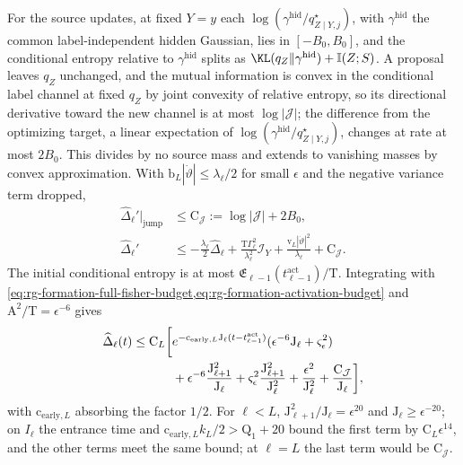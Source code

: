 For the source updates, at fixed \(Y=y\) each
\(\log(\gamma^{\mathrm{hid}}/q^\star_{Z\mid Y,j})\), with \(\gamma^{\mathrm{hid}}\)
the common label-independent hidden Gaussian, lies in \([-B_0,B_0]\), and the
conditional entropy relative to \(\gamma^{\mathrm{hid}}\) splits as
\(\KL(q_Z\Vert\gamma^{\mathrm{hid}})+\mathbb I(Z;S)\). A proposal leaves \(q_Z\)
unchanged, and the mutual information is convex in the conditional label
channel at fixed \(q_Z\) by joint convexity of relative entropy, so its
directional derivative toward the new channel is at most \(\log|\mathcal J|\);
the difference from the optimizing target, a linear expectation of
\(\log(\gamma^{\mathrm{hid}}/q^\star_{Z\mid Y,j})\), changes at rate at most
\(2B_0\). This divides by no source mass and extends to vanishing masses by
convex approximation. With \(\mathrm b_L|\dot\vartheta|\le\lambda_\ell/2\) for
small \(\epsilon\) and the negative variance term dropped,
\begin{align}
 \widehat\Delta_\ell'|_{\mathrm{jump}}&\le
 \mathrm C_{\mathcal J}:=\log|\mathcal J|+2B_0,
 \label{eq:rg-formation-conditional-jump-remainder}\\
 \widehat\Delta_\ell'
 &\le-\frac{\lambda_\ell}{2}\widehat\Delta_\ell
     +\frac{\mathrm T\Gamma_\ell^2}{\lambda_\ell^2}\mathcal I_Y
     +\frac{\mathrm v_L|\dot\vartheta|^2}{\lambda_\ell}
     +\mathrm C_{\mathcal J}.
 \label{eq:rg-formation-conditional-differential-bound}
\end{align}
The initial conditional entropy is at most
\(\mathfrak E_{\ell-1}(t^{\mathrm{act}}_{\ell-1})/\mathrm T\). Integrating with
\cref{eq:rg-formation-full-fisher-budget,eq:rg-formation-activation-budget}
and \(\mathrm A^2/\mathrm T=\epsilon^{-6}\) gives
\begin{align}
 \widehat\Delta_\ell(t)\le \mathrm C_L\bigg[
 &e^{-\mathrm c_{\mathrm{early},L}\mathrm J_\ell(t-t^{\mathrm{act}}_{\ell-1})}
                 (\epsilon^{-6}\mathrm J_\ell+\varsigma_\epsilon^2)
 \notag\\
 &+\epsilon^{-6}\frac{\mathrm J_{\ell+1}^2}{\mathrm J_\ell}
 +\varsigma_\epsilon^2\frac{\mathrm J_{\ell+1}^2}{\mathrm J_\ell^2}
 +\frac{\epsilon^2}{\mathrm J_\ell^2}+\frac{\mathrm C_{\mathcal J}}{\mathrm J_\ell}\bigg],
 \label{eq:rg-formation-early-entropy-bound}
\end{align}
with \(\mathrm c_{\mathrm{early},L}\) absorbing the factor \(1/2\). For
\(\ell<L\), \(\mathrm J_{\ell+1}^2/\mathrm J_\ell=\epsilon^{20}\) and
\(\mathrm J_\ell\ge\epsilon^{-20}\); on \(I_\ell\) the entrance time and
\(\mathrm c_{\mathrm{early},L}k_L/2>\mathrm Q_1+20\) bound the first term by
\(\mathrm C_L\epsilon^{14}\), and the other terms meet the same bound; at
\(\ell=L\) the last term would be \(\mathrm C_{\mathcal J}\).

